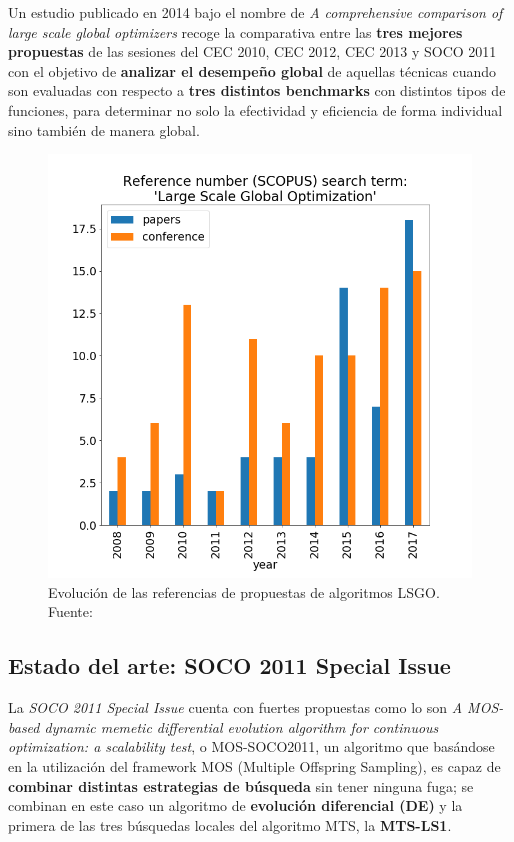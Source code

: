 Un estudio publicado en 2014 bajo el nombre de \textit{A comprehensive comparison of large scale global optimizers}\cite{ComprehensiveComparison} recoge la comparativa entre las \textbf{tres mejores propuestas} de las sesiones del CEC 2010, CEC 2012, CEC 2013 y SOCO 2011 con el objetivo de \textbf{analizar el desempeño global} de aquellas técnicas cuando son evaluadas con respecto a\textbf{ tres distintos benchmarks} con distintos tipos de funciones, para determinar no solo la efectividad y eficiencia de forma individual sino también de manera global.

\begin{figure}[h]
	\centering
	\includegraphics[scale=0.5]{imagenes/LSGO-Evolution}
	\caption{Evolución de las referencias de propuestas de algoritmos LSGO. Fuente: \cite{WCCI-SHADEILS}}
	\label{fig:LSGO-Evolution}
\end{figure}

\subsection{Estado del arte: SOCO 2011 Special Issue}
La \textit{SOCO 2011 Special Issue} cuenta con fuertes propuestas como lo son \textit{A MOS-based dynamic memetic differential evolution algorithm for continuous optimization: a scalability test}\cite{MOS2010}, o MOS-SOCO2011, un algoritmo que basándose en la utilización del framework MOS (Multiple Offspring Sampling), es capaz de \textbf{combinar distintas estrategias de búsqueda} sin tener ninguna fuga; se combinan en este caso un algoritmo de \textbf{evolución diferencial (DE)} y la primera de las tres búsquedas locales del algoritmo MTS\cite{MTS-LSGO}, la \textbf{MTS-LS1}.

